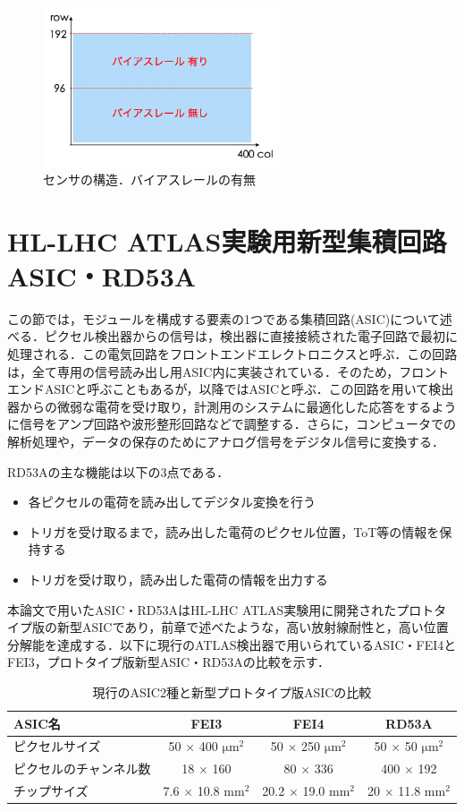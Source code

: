 \begin{figure}[h]
  \centering
  \includegraphics[width=7cm]{./figure/sensor.png}
  \caption{センサの構造．バイアスレールの有無}
  \label{fig:sensor}
\end{figure}


\section{HL-LHC ATLAS実験用新型集積回路ASIC・RD53A}
\label{sec:rd53a}
この節では，モジュールを構成する要素の1つである集積回路(ASIC)について述べる．ピクセル検出器からの信号は，検出器に直接接続された電子回路で最初に処理される．この電気回路をフロントエンドエレクトロニクスと呼ぶ．この回路は，全て専用の信号読み出し用ASIC内に実装されている．そのため，フロントエンドASICと呼ぶこともあるが，以降ではASICと呼ぶ．この回路を用いて検出器からの微弱な電荷を受け取り，計測用のシステムに最適化した応答をするように信号をアンプ回路や波形整形回路などで調整する．さらに，コンピュータでの解析処理や，データの保存のためにアナログ信号をデジタル信号に変換する．\par
RD53Aの主な機能は以下の3点である．
\begin{itemize}
  \item 各ピクセルの電荷を読み出してデジタル変換を行う
  \item トリガを受け取るまで，読み出した電荷のピクセル位置，ToT等の情報を保持する
  \item トリガを受け取り，読み出した電荷の情報を出力する
\end{itemize}

本論文で用いたASIC・RD53AはHL-LHC ATLAS実験用に開発されたプロトタイプ版の新型ASICであり，前章で述べたような，高い放射線耐性と，高い位置分解能を達成する．以下に現行のATLAS検出器で用いられているASIC・FEI4とFEI3，プロトタイプ版新型ASIC・RD53Aの比較を示す．

\begin{table}[h]
  \centering
  \caption{現行のASIC2種と新型プロトタイプ版ASICの比較}
  \begin{tabular} {l|cc|c} \hline
    ASIC名 & FEI3 & FEI4 & RD53A \\ \hline \hline
    ピクセルサイズ & 50 $\times$ 400 $\mathrm{\mu m^2}$ & 50 $\times$ 250 $\mathrm{\mu m^2}$ & 50 $\times$ 50 $\mathrm{\mu m^2}$ \\
    ピクセルのチャンネル数 & 18 $\times$ 160 & 80 $\times$ 336 & 400 $\times$ 192  \\ 
    チップサイズ & 7.6 $\times$ 10.8 $\mathrm{mm^2}$ & 20.2 $\times$ 19.0 $\mathrm{mm^2}$ & 20 $\times$ 11.8 $\mathrm{mm^2}$\\ \hline
  \end{tabular}
  \label{tab:ASIC}
\end{table}


